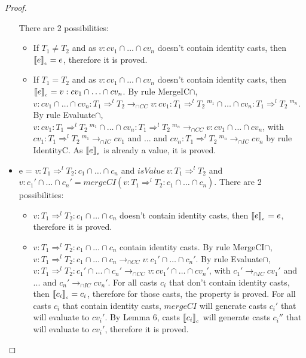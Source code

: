 \documentclass[a4paper]{article}
\begin{document}
\begin{proof}
\begin{itemize}
    There are 2 possibilities:
    \begin{itemize}
        \item If $T_1 \neq T_2$ and as $v : cv_1 \cap \ldots \cap cv_n$ doesn't contain identity casts, then $\llbracket e \rrbracket_{_e} = e$, therefore it is proved.
        \item If $T_1 = T_2$ and as $v : cv_1 \cap \ldots \cap cv_n$ doesn't contain identity casts, then $\llbracket e \rrbracket_{_e} = v : cv_1 \cap \ldots \cap cv_n$.
        By rule MergeIC$\cap$, $v : cv_1 \cap \ldots \cap cv_n : T_1 \Rightarrow^l T_2 \longrightarrow_{\cap CC} v : cv_1 : T_1 \Rightarrow^l T_2\ ^{m_1} \cap \ldots \cap cv_n : T_1 \Rightarrow^l T_2\ ^{m_n}$.
        By rule Evaluate$\cap$, $v : cv_1 : T_1 \Rightarrow^l T_2\ ^{m_1} \cap \ldots \cap cv_n : T_1 \Rightarrow^l T_2\ ^{m_n} \longrightarrow_{\cap CC} v : cv_1 \cap \ldots \cap cv_n$, with $cv_1 : T_1 \Rightarrow^l T_2\ ^{m_1} \longrightarrow_{\cap IC} cv_1$ and ... and $cv_n : T_1 \Rightarrow^l T_2\ ^{m_n} \longrightarrow_{\cap IC} cv_n$ by rule IdentityC.
        As $\llbracket e \rrbracket_{_e}$ is already a value, it is proved.
    \end{itemize}
    \item e = $v : T_1 \Rightarrow^l T_2 : c_1 \cap \ldots \cap c_n$ and $isValue\ v : T_1 \Rightarrow^l T_2$ and $v : c_1' \cap \ldots \cap c_n' = mergeCI (v : T_1 \Rightarrow^l T_2 : c_1 \cap \ldots \cap c_n)$.
    There are 2 possibilities:
    \begin{itemize}
        \item $v : T_1 \Rightarrow^l T_2 : c_1 \cap \ldots \cap c_n$ doesn't contain identity casts, then $\llbracket e \rrbracket_{_e} = e$, therefore it is proved.
        \item $v : T_1 \Rightarrow^l T_2 : c_1 \cap \ldots \cap c_n$ contain identity casts.
        By rule MergeCI$\cap$, $v : T_1 \Rightarrow^l T_2 : c_1 \cap \ldots \cap c_n \longrightarrow_{\cap CC} v : c_1' \cap \ldots \cap c_n'$.
        By rule Evaluate$\cap$, $v : T_1 \Rightarrow^l T_2 : c_1' \cap \ldots \cap c_n' \longrightarrow_{\cap CC} v : cv_1' \cap \ldots \cap cv_n'$, with $c_1' \longrightarrow_{\cap IC} cv_1'$ and ... and $c_n' \longrightarrow_{\cap IC} cv_n'$.
        For all casts $c_i$ that don't contain identity casts, then $\llbracket c_i \rrbracket_{_c} = c_i$, therefore for those casts, the property is proved.
        For all casts $c_i$ that contain identity casts, $mergeCI$ will generate casts $c_i'$ that will evaluate to $cv_i'$.
        By Lemma 6, casts $\llbracket c_i \rrbracket_{_c}$ will generate casts $c_i''$ that will evaluate to $cv_i'$, therefore it is proved.

\end{itemize}
\end{itemize}
\end{proof}
\end{document}
